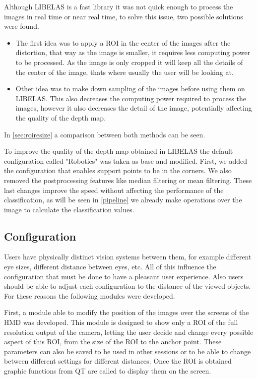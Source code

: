 \documentclass[10pt,a4paper,twocolumn,twoside]{article}
\begin{document}
	 Although LIBELAS is a fast library it was not quick enough to process the images in real time or near real time, to solve this issue, two possible solutions were found. 
	 
	 \begin{itemize}
	 	\item The first idea was to apply a ROI in the center of the images after the distortion, that way as the image is smaller, it requires less computing power to be processed. As the image is only cropped it will keep all the details of the center of the image, thats where usually the user will be looking at.  
	 	 
	 	\item Other idea was to make down sampling of the images before using them on LIBELAS. This also decreases the computing power required to process the images, however it also decreases the detail of the image, potentially affecting the quality of the depth map.  
 	 \end{itemize}
	 In \ref{sec:roiresize} a comparison between both methods can be seen. 
	 
	 To improve the quality of the depth map obtained in LIBELAS the default configuration called "Robotics" was taken as base and modified. First, we added the configuration that enables support points to be in the corners. We also removed the postprocessing features like median filtering or mean filtering. These last changes improve the speed without affecting the performance of the classification, as will be seen in \ref{pipeline} we already make operations over the image to calculate the classification values.  
	 
	\subsection{Configuration}
	
	Users have physically distinct vision systems between them, for example different eye sizes, different distance between eyes, etc. All of this influence the configuration that must be done to have a pleasant user experience. Also users should be able to adjust each configuration to the distance of the viewed objects.  For these reasons the following modules were developed.
	
	First, a module able to modify the position of the images over the screens of the HMD was developed. This module is designed to show only a ROI of the full resolution output of the camera, letting the user decide and change every possible aspect of this ROI, from the size of the ROI to the anchor point. These parameters can also be saved to be used in other sessions or to be able to change between different settings for different distances. Once the ROI is obtained graphic functions from QT are called to display them on the screen.
	
\end{document}
